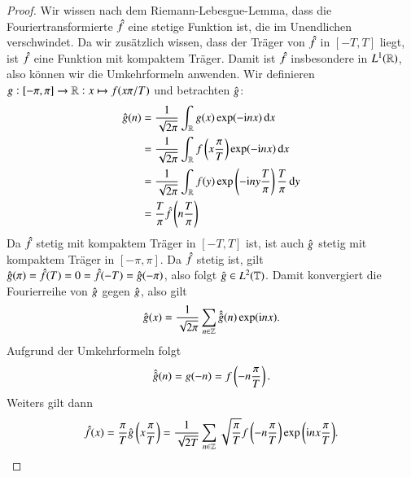 \begin{proof}
  Wir wissen nach dem Riemann-Lebesgue-Lemma, dass die Fouriertransformierte $\hat{f}$ eine stetige Funktion ist, die im Unendlichen verschwindet.
  Da wir zusätzlich wissen, dass der Träger von $\hat{f}$ in $[{-T},T]$ liegt, ist $\hat{f}$ eine Funktion mit kompaktem Träger.
  Damit ist $\hat{f}$ insbesondere in $L^1(\mathbb{R})$, also können wir die Umkehrformeln anwenden.
  Wir definieren $g:[-\pi,\pi] \to \mathbb{R}: x \mapsto f(x\pi/T)$ und betrachten $\hat{g}$:
  \begin{equation*}
    \begin{split}
    \fouriertransform{g}(n)
    &= \frac{1}{\sqrt{2\pi}} \int_\R{g(x) \exp(-\i nx) \dif x} \\
    &= \frac{1}{\sqrt{2\pi}} \int_\R{f\left(x \frac{\pi}{T}\right) \exp(-\i nx) \dif x} \\
    &= \frac{1}{\sqrt{2\pi}} \int_\R{f(y) \exp\left(-\i ny \frac{T}{\pi}\right) \frac{T}{\pi} \dif y} \\
    &= \frac{T}{\pi} \fouriertransform{f}\left(n\frac{T}{\pi}\right)
    \end{split}
  \end{equation*}
  Da $\hat{f}$ stetig mit kompaktem Träger in $[-T,T]$ ist, ist auch $\hat{g}$ stetig mit kompaktem Träger in $[-\pi,\pi]$.
  Da $\hat{f}$ stetig ist, gilt $\hat{g}(\pi)=\hat{f}(T)=0=\hat{f}(-T)=\hat{g}(-\pi)$, also folgt $\hat{g} \in L^2(\mathbb{T})$. Damit konvergiert die Fourierreihe von $\hat{g}$ gegen $\hat{g}$, also gilt
  \begin{equation*}
    \hat{g}(x)=\frac{1}{\sqrt{2\pi}}\sum_{n \in \mathbb{Z}}{\hat{\hat{g}}(n) \exp(\mathrm{i} nx)}.
  \end{equation*}
  Aufgrund der Umkehrformeln folgt
  \begin{equation*}
    \hat{\hat{g}}(n)
    =g(-n)
    =f\left(-n\frac{\pi}{T}\right).
  \end{equation*}
  Weiters gilt dann
  \begin{equation*}
    \hat{f}(x)
    =\frac{\pi}{T} \hat{g}\left(x\frac{\pi}{T}\right) = \frac{1}{\sqrt{2T}} \sum_{n \in \mathbb{Z}}{\sqrt{\frac{\pi}{T}}f\left(-n\frac{\pi}{T}\right) \exp\left(\mathrm{i} n x\frac{\pi}{T}\right)}.
  \end{equation*}


\end{proof}
